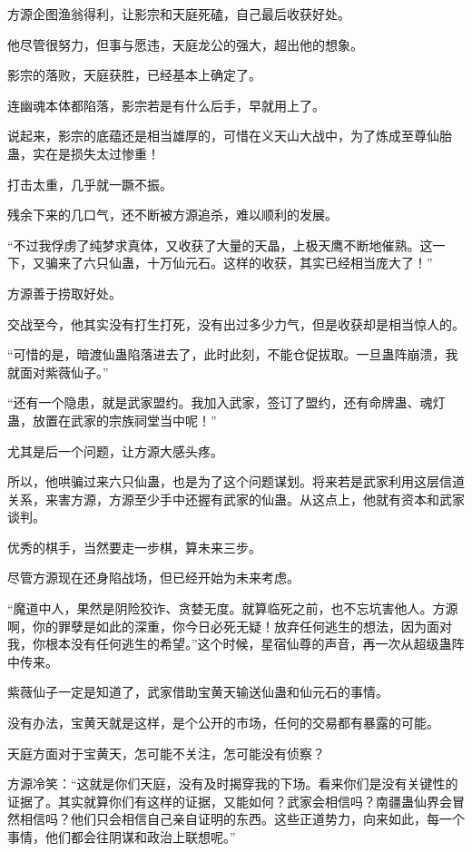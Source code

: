 \begin{this_body}
方源企图渔翁得利，让影宗和天庭死磕，自己最后收获好处。

他尽管很努力，但事与愿违，天庭龙公的强大，超出他的想象。

影宗的落败，天庭获胜，已经基本上确定了。

连幽魂本体都陷落，影宗若是有什么后手，早就用上了。

说起来，影宗的底蕴还是相当雄厚的，可惜在义天山大战中，为了炼成至尊仙胎蛊，实在是损失太过惨重！

打击太重，几乎就一蹶不振。

残余下来的几口气，还不断被方源追杀，难以顺利的发展。

“不过我俘虏了纯梦求真体，又收获了大量的天晶，上极天鹰不断地催熟。这一下，又骗来了六只仙蛊，十万仙元石。这样的收获，其实已经相当庞大了！”

方源善于捞取好处。

交战至今，他其实没有打生打死，没有出过多少力气，但是收获却是相当惊人的。

“可惜的是，暗渡仙蛊陷落进去了，此时此刻，不能仓促拔取。一旦蛊阵崩溃，我就面对紫薇仙子。”

“还有一个隐患，就是武家盟约。我加入武家，签订了盟约，还有命牌蛊、魂灯蛊，放置在武家的宗族祠堂当中呢！”

尤其是后一个问题，让方源大感头疼。

所以，他哄骗过来六只仙蛊，也是为了这个问题谋划。将来若是武家利用这层信道关系，来害方源，方源至少手中还握有武家的仙蛊。从这点上，他就有资本和武家谈判。

优秀的棋手，当然要走一步棋，算未来三步。

尽管方源现在还身陷战场，但已经开始为未来考虑。

“魔道中人，果然是阴险狡诈、贪婪无度。就算临死之前，也不忘坑害他人。方源啊，你的罪孽是如此的深重，你今日必死无疑！放弃任何逃生的想法，因为面对我，你根本没有任何逃生的希望。”这个时候，星宿仙尊的声音，再一次从超级蛊阵中传来。

紫薇仙子一定是知道了，武家借助宝黄天输送仙蛊和仙元石的事情。

没有办法，宝黄天就是这样，是个公开的市场，任何的交易都有暴露的可能。

天庭方面对于宝黄天，怎可能不关注，怎可能没有侦察？

方源冷笑：“这就是你们天庭，没有及时揭穿我的下场。看来你们是没有关键性的证据了。其实就算你们有这样的证据，又能如何？武家会相信吗？南疆蛊仙界会冒然相信吗？他们只会相信自己亲自证明的东西。这些正道势力，向来如此，每一个事情，他们都会往阴谋和政治上联想呢。”


\end{this_body}
